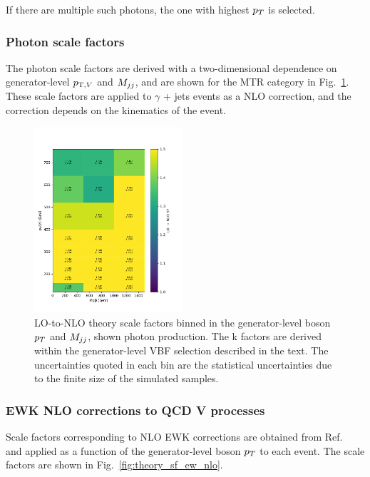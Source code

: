 If there are multiple such photons, the one with highest $p_T$ is selected.

\subsubsection{Photon scale factors}

The photon scale factors are derived with a two-dimensional dependence on generator-level $p_{\mathrm{T},V}$ and $M_{jj}$, and are shown for the MTR category in 
Fig.~\ref{fig:theory_sf_qcd_nlo_2d-photon}. These scale factors are applied to $\gamma$ + jets events as a NLO correction, and the correction depends
on the kinematics of the event.

\begin{figure}[ht!]
    \begin{center}
        \includegraphics[width=0.49\textwidth]{ScaleFactors/NLO/2d_gjets_gen_vpt_vbf_stat1.pdf}
        \caption{
            LO-to-NLO theory scale factors binned in the generator-level boson $p_T$ and $M_{jj}$, shown photon production.
            The k factors are derived within the generator-level VBF selection described in the text.
            The uncertainties quoted in each bin are the statistical uncertainties due to the finite size of the simulated samples.
          }
      \label{fig:theory_sf_qcd_nlo_2d-photon}
    \end{center}
\end{figure}

\subsubsection{EWK NLO corrections to QCD V processes}

Scale factors corresponding to NLO EWK corrections are obtained from Ref.~\cite{DMTheory} and applied as a function of the generator-level boson $p_T$
to each event. The scale factors are shown in Fig.~\ref{fig:theory_sf_ew_nlo}.

